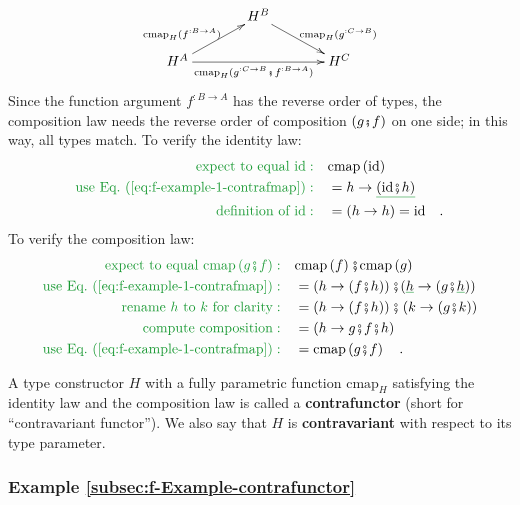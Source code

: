 \[
\xymatrix{\xyScaleY{1.5pc}\xyScaleX{3pc} & H^{B}\ar[rd]\sp(0.6){\ ~\text{cmap}_{H}(g^{:C\rightarrow B})}\\
H^{A}\ar[ru]\sp(0.4){\text{cmap}_{H}(f^{:B\rightarrow A})\ }\ar[rr]\sb(0.5){\text{cmap}_{H}(g^{:C\rightarrow B}\bef f^{:B\rightarrow A})\ ~} &  & H^{C}
}
\]
Since the function argument $f^{:B\rightarrow A}$ has the reverse
order of types, the composition law needs the reverse order of composition
$\left(g\bef f\right)$ on one side; in this way, all types match.
To verify the identity law:
\begin{align*}
{\color{greenunder}\text{expect to equal }\text{id}:}\quad & \text{cmap}\left(\text{id}\right)\\
{\color{greenunder}\text{use Eq.~(\ref{eq:f-example-1-contrafmap})}:}\quad & =h\rightarrow\gunderline{(\text{id}\bef h)}\\
{\color{greenunder}\text{definition of }\text{id}:}\quad & =\left(h\rightarrow h\right)=\text{id}\quad.
\end{align*}
To verify the composition law:
\begin{align*}
{\color{greenunder}\text{expect to equal }\text{cmap}\left(g\bef f\right):}\quad & \text{cmap}\left(f\right)\bef\text{cmap}\left(g\right)\\
{\color{greenunder}\text{use Eq.~(\ref{eq:f-example-1-contrafmap})}:}\quad & =\left(h\rightarrow(f\bef h)\right)\bef(\gunderline h\rightarrow(g\bef\gunderline h))\\
{\color{greenunder}\text{rename }h\text{ to }k\text{ for clarity}:}\quad & =\left(h\rightarrow(f\bef h)\right)\bef\left(k\rightarrow(g\bef k)\right)\\
{\color{greenunder}\text{compute composition}:}\quad & =\left(h\rightarrow g\bef f\bef h\right)\\
{\color{greenunder}\text{use Eq.~(\ref{eq:f-example-1-contrafmap})}:}\quad & =\text{cmap}\left(g\bef f\right)\quad.
\end{align*}

A type constructor $H$ with a fully parametric function $\text{cmap}_{H}$
satisfying the identity law and the composition law is called a \textbf{contrafunctor}
(short for \textsf{``}contravariant functor\textsf{''}). We also say that $H$ is
\textbf{contravariant} with respect to its
type parameter.

\subsubsection{Example \label{subsec:f-Example-contrafunctor}\ref{subsec:f-Example-contrafunctor}}

